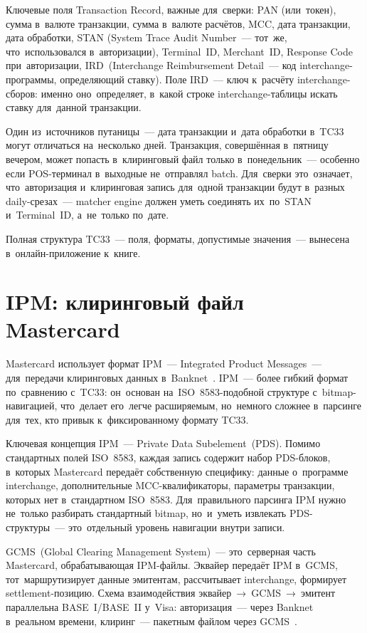 Ключевые поля Transaction Record, важные для~сверки: PAN (или~токен),
сумма в~валюте транзакции, сумма в~валюте расчётов, MCC, дата транзакции,
дата обработки, STAN (System Trace Audit Number~--- тот~же, что~использовался
в~авторизации), Terminal~ID, Merchant~ID, Response Code при~авторизации,
IRD~(Interchange Reimbursement Detail~--- код interchange-программы,
определяющий ставку). Поле IRD~--- ключ к~расчёту interchange-сборов:
именно оно~определяет, в~какой строке interchange-таблицы искать ставку
для~данной транзакции.

Один из~источников путаницы~--- дата транзакции и~дата обработки
в~TC33 могут отличаться на~несколько дней. Транзакция, совершённая
в~пятницу вечером, может попасть в~клиринговый файл только в~понедельник~---
особенно если POS-терминал в~выходные не~отправлял batch. Для~сверки
это~означает, что~авторизация и~клиринговая запись для~одной транзакции
будут в~разных daily-срезах~--- matcher engine должен уметь соединять
их~по~STAN и~Terminal~ID, а~не~только по~дате.

Полная структура TC33~--- поля, форматы, допустимые значения~--- вынесена
в~онлайн-приложение к~книге.


\section{IPM: клиринговый файл Mastercard}
\label{sec:recon-ipm}

Mastercard использует формат IPM~--- Integrated Product Messages~---
для~передачи клиринговых данных в~Banknet~. IPM~--- более
гибкий формат по~сравнению с~TC33: он~основан на~ISO~8583-подобной
структуре с~bitmap-навигацией, что~делает его~легче расширяемым, но~немного
сложнее в~парсинге для~тех, кто привык к~фиксированному формату TC33.

Ключевая концепция IPM~--- Private Data Subelement~(PDS). Помимо стандартных
полей ISO~8583, каждая запись содержит набор PDS-блоков, в~которых
Mastercard передаёт собственную специфику: данные о~программе interchange,
дополнительные MCC-квалификаторы, параметры транзакции, которых нет
в~стандартном ISO~8583. Для~правильного парсинга IPM нужно не~только
разбирать стандартный bitmap, но~и~уметь извлекать PDS-структуры~---
это~отдельный уровень навигации внутри записи.

GCMS~(Global Clearing Management System)~--- это~серверная часть
Mastercard, обрабатывающая IPM-файлы. Эквайер передаёт IPM в~GCMS,
тот~маршрутизирует данные эмитентам, рассчитывает interchange,
формирует settlement-позицию. Схема взаимодействия эквайер~→~GCMS~→~эмитент
параллельна BASE~I/BASE~II у~Visa: авторизация~--- через Banknet в~реальном
времени, клиринг~--- пакетным файлом через GCMS~.

